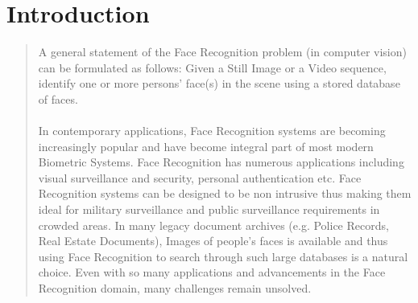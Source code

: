 \section*{Introduction}
\begin{quote}
A general statement of the Face Recognition problem (in computer vision) can be formulated as follows: Given a Still Image or a Video sequence, identify one or more persons' face(s) in the scene using a stored database of faces.\\ 
\\
In contemporary applications, Face Recognition systems are becoming increasingly popular and have become integral part of most modern Biometric Systems.  Face Recognition has   numerous applications   including   visual   surveillance   and   security, personal authentication etc. Face Recognition systems can be designed to be non intrusive thus making them ideal for military surveillance and public surveillance requirements in crowded areas. In many legacy document archives (e.g. Police Records, Real Estate Documents), Images of people's faces is available and thus using Face Recognition to search through such large databases is a natural choice. Even with so many applications and advancements in the Face Recognition domain, many challenges remain unsolved.
\end{quote}
